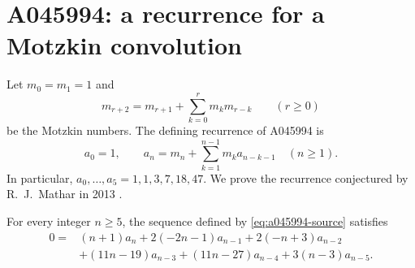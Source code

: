 \section{A045994: a recurrence for a Motzkin convolution}

Let $m_0=m_1=1$ and
\[
 m_{r+2}=m_{r+1}+\sum_{k=0}^{r}m_km_{r-k}\qquad(r\ge0)
\]
be the Motzkin numbers. The defining recurrence of A045994 is
\begin{equation}\label{eq:a045994-source}
 a_0=1,\qquad
 a_n=m_n+\sum_{k=1}^{n-1}m_ka_{n-k-1}\quad(n\ge1).
\end{equation}
In particular, $a_0,\ldots,a_5=1,1,3,7,18,47$.
We prove the recurrence conjectured by R.~J.~Mathar in 2013
\cite{a045994-source}.

\begin{theorem}\label{thm:a045994}
For every integer $n\ge5$, the sequence defined by
\eqref{eq:a045994-source} satisfies
\[
\begin{aligned}
0={}&(n+1)a_n+2(-2n-1)a_{n-1}+2(-n+3)a_{n-2}\\
 &+(11n-19)a_{n-3}+(11n-27)a_{n-4}+3(n-3)a_{n-5}.
\end{aligned}
\]
\end{theorem}

